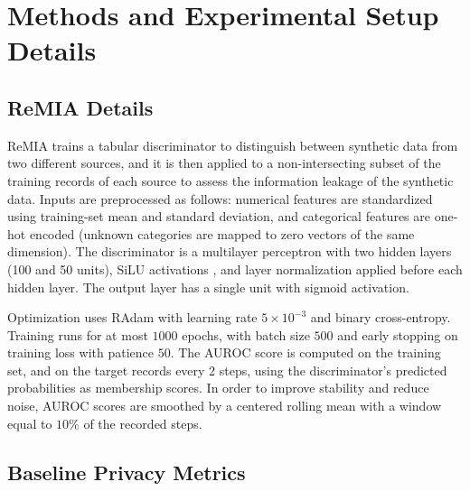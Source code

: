 \section{Methods and Experimental Setup Details}
\label{app:experimental_setup}

\subsection{ReMIA Details}
\label{app:remia_details}
ReMIA trains a tabular discriminator to distinguish between synthetic data from two different sources, and it is then applied to a non-intersecting subset of the training records of each source to assess the information leakage of the synthetic data.
Inputs are preprocessed as follows: numerical features are standardized using training-set mean and standard deviation, and categorical features are one-hot encoded (unknown categories are mapped to zero vectors of the same dimension).
The discriminator is a multilayer perceptron with two hidden layers (100 and 50 units), SiLU activations \citep{elfwing2018sigmoid}, and layer normalization \citep{ba2016layer} applied before each hidden layer. The output layer has a single unit with sigmoid activation.

Optimization uses RAdam \citep{loshchilov2017decoupled} with learning rate $5\times 10^{-3}$ and binary cross-entropy. Training runs for at most $1000$ epochs, with batch size $500$ and early stopping on training loss with patience $50$.
The AUROC score is computed on the training set, and on the target records every 2 steps, using the discriminator's predicted probabilities as membership scores. In order to improve stability and reduce noise, AUROC scores are smoothed by a centered rolling mean with a window equal to $10\%$ of the recorded steps.


\subsection{Baseline Privacy Metrics}
\label{app:baseline_privacy_metrics}

